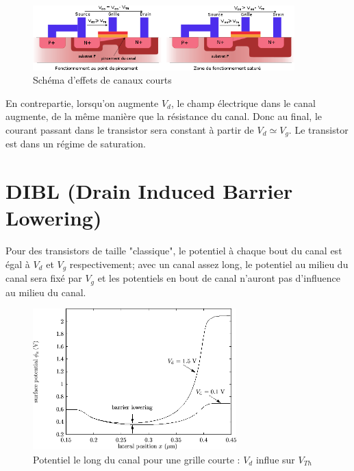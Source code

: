 \documentclass[a4paper,11pt]{report}
\begin{document}
\begin{figure}[h]
    \begin{center}
        \includegraphics[width=0.9\textwidth]{Images/Canaux_Courts.png}
        \caption{Schéma d'effets de canaux courts}
        \label{fig:canaux}
    \end{center}
\end{figure}

En contrepartie, lorsqu'on augmente $V_d$, le champ électrique dans le canal augmente, de la même manière que la résistance du canal. Donc au final, le courant passant dans le transistor sera constant à partir de $V_d \simeq V_g$. Le transistor est dans un régime de saturation.

\section{DIBL (Drain Induced Barrier Lowering)}
Pour des transistors de taille "classique", le potentiel à chaque bout du canal est égal à $V_d$ et $V_g$ respectivement; avec un canal assez long, le potentiel au milieu du canal sera fixé par $V_g$ et les potentiels en bout de canal n'auront pas d'influence au milieu du canal.

\begin{figure}[h]
    \begin{center}
        \includegraphics[width=0.7\textwidth]{Images/DIBL_schema.png}
        \caption{Potentiel le long du canal pour une grille courte : $V_d$ influe sur $V_{Th}$}
        \label{fig:potcanaux}
    \end{center}
\end{figure}
\end{document}
